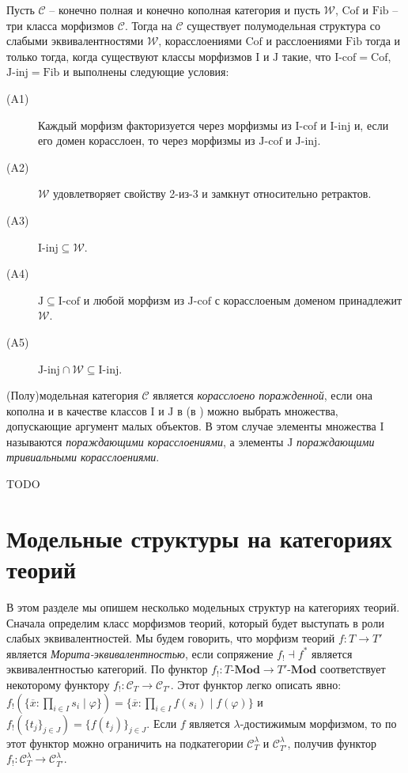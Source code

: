\documentclass[reqno]{amsart}
\theoremstyle{definition}
\theoremstyle{remark}
\newcommand{\bcat}[1]{\mathbf{#1}}
\newcommand{\cat}[1]{\mathcal{#1}}
\renewcommand{\C}{\cat{C}}
\newcommand{\we}{\mathcal{W}}
\newcommand{\fib}{\mathrm{Fib}}
\newcommand{\cof}{\mathrm{Cof}}
\newcommand{\Mod}[1]{#1\text{-}\bcat{Mod}}
\newcommand{\I}{\mathrm{I}}
\newcommand{\J}{\mathrm{J}}
\newcommand{\class}[2]{#1\text{-}\mathrm{#2}}
\newcommand{\Iinj}[1][\I]{\class{#1}{inj}}
\newcommand{\Icof}[1][\I]{\class{#1}{cof}}
\newcommand{\Jinj}[1][]{\Iinj[\J#1]}
\newcommand{\Jcof}[1][]{\Icof[\J#1]}
\begin{document}
\begin{prop}
Пусть $\C$ -- конечно полная и конечно кополная категория и пусть $\we$, $\cof$ и $\fib$ -- три класса морфизмов $\C$.
Тогда на $\C$ существует полумодельная структура со слабыми эквивалентностями $\we$, корасслоениями $\cof$ и расслоениями $\fib$ тогда и только тогда,
когда существуют классы морфизмов $\I$ и $\J$ такие, что $\Icof = \cof$, $\Jinj = \fib$ и выполнены следующие условия:
\begin{description}
\item[(A1)] Каждый морфизм факторизуется через морфизмы из $\Icof$ и $\Iinj$ и, если его домен корасслоен, то через морфизмы из $\Jcof$ и $\Jinj$.
\item[(A2)] $\we$ удовлетворяет свойству 2-из-3 и замкнут относительно ретрактов.
\item[(A3)] $\Iinj \subseteq \we$.
\item[(A4)] $\J \subseteq \Icof$ и любой морфизм из $\Jcof$ с корасслоеным доменом принадлежит $\we$.
\item[(A5)] $\Jinj \cap \we \subseteq \Iinj$.
\end{description}
\end{prop}

\begin{defn}
(Полу)модельная категория $\C$ является \emph{корасслоено поражденной}, если она кополна и в качестве классов $\I$ и $\J$ в  (в ) можно выбрать множества, допускающие аргумент малых объектов.
В этом случае элементы множества $\I$ называются \emph{пораждающими корасслоениями}, а элементы $\J$ \emph{пораждающими тривиальными корасслоениями}.
\end{defn}

TODO

\section{Модельные структуры на категориях теорий}

В этом разделе мы опишем несколько модельных структур на категориях теорий.
Сначала определим класс морфизмов теорий, который будет выступать в роли слабых эквивалентностей.
Мы будем говорить, что морфизм теорий $f : T \to T'$ является \emph{Морита-эквивалентностью}, если сопряжение $f_! \dashv f^*$ является эквивалентностью категорий.
По  функтор $f_! : \Mod{T} \to \Mod{T'}$ соответствует некоторому функтору $f_! : \cat{C}_T \to \cat{C}_{T'}$.
Этот функтор легко описать явно: $f_!(\{ \overline{x} : \prod_{i \in I} s_i \mid \varphi \}) = \{ \overline{x} : \prod_{i \in I} f(s_i) \mid f(\varphi) \}$ и $f_!(\{ t_j \}_{j \in J}) = \{ f(t_j) \}_{j \in J}$.
Если $f$ является $\lambda$-достижимым морфизмом, то по  этот функтор можно ограничить на подкатегории $\cat{C}_T^\lambda$ и $\cat{C}_{T'}^\lambda$, получив функтор $f_! : \cat{C}_T^\lambda \to \cat{C}_{T'}^\lambda$.
\end{document}

